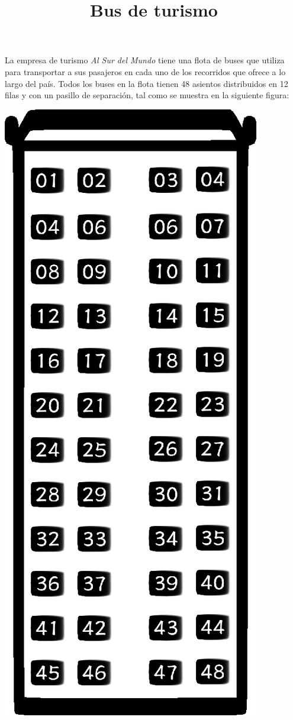 \documentclass{oci}
\title{Bus de turismo}
\begin{document}
\begin{problemDescription}
  La empresa de turismo \emph{Al Sur del Mundo} tiene una flota de buses que
  utiliza para transportar a sus pasajeros en cada uno de los recorridos que
  ofrece a lo largo del país. 
  Todos los buses en la flota tienen 48 asientos distribuidos en 12 filas y con
  un pasillo de separación, tal como se muestra en la siguiente figura:

  \begin{center}
  \includegraphics[angle=270,origin=c,scale=0.8]{bus.eps}

\end{center}
\end{problemDescription}
\end{document}
